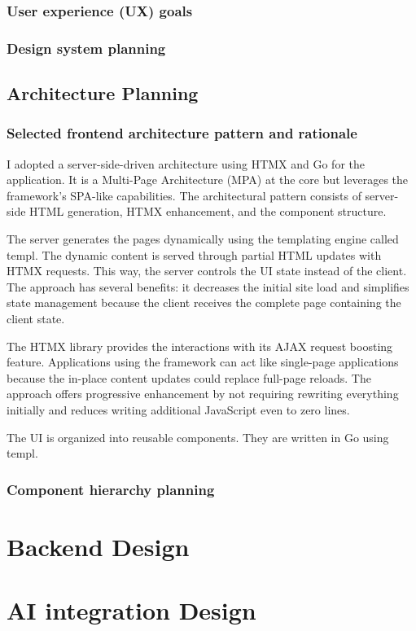 \subsubsection{User experience (UX) goals}

\subsubsection{Design system planning}

\subsection{Architecture Planning}

\subsubsection{Selected frontend architecture pattern and rationale}
        
I adopted a server-side-driven architecture using HTMX and Go for the application. It is a Multi-Page Architecture (MPA) at the core but leverages the framework's SPA-like capabilities. The architectural pattern consists of server-side HTML generation, HTMX enhancement, and the component structure.

The server generates the pages dynamically using the templating engine called templ. The dynamic content is served through partial HTML updates with HTMX requests. This way, the server controls the UI state instead of the client. The approach has several benefits: it decreases the initial site load and simplifies state management because the client receives the complete page containing the client state.

The HTMX library provides the interactions with its AJAX request boosting feature. Applications using the framework can act like single-page applications because the in-place content updates could replace full-page reloads. The approach offers progressive enhancement by not requiring rewriting everything initially and reduces writing additional JavaScript even to zero lines.

The UI is organized into reusable components. They are written in Go using templ.

\subsubsection{Component hierarchy planning}

\subsubsection{}

\section{Backend Design}

\section{AI integration Design}